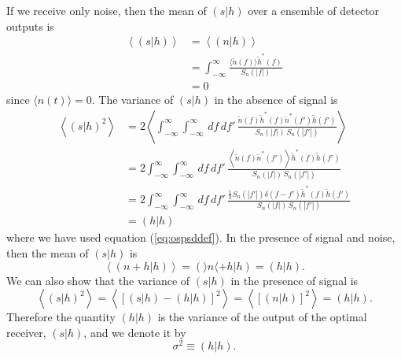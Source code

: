 If we receive only noise, then the mean of $(s|h)$ over a ensemble of detector
outputs is 
\begin{equation}
\begin{split}
\left\langle (s|h) \right\rangle &= \left\langle (n|h) \right\rangle \\
&= \int_{-\infty}^{\infty} 
   \frac{\langle\tilde{n}(f)\rangle \tilde{h}^\ast(f)}{S_n(|f|)} \\
&= 0
\end{split}
\end{equation}
since $\langle n(t) \rangle = 0$. The variance of $(s|h)$ in the absence of
signal is
\begin{equation}
\begin{split}
\left\langle(s|h)^2\right\rangle 
&= 2 \left\langle \int_{-\infty}^\infty \int_{-\infty}^\infty \,df\,df'\,
\frac{\tilde{n}(f)\tilde{h}^\ast(f) \tilde{n}^\ast(f')\tilde{h}(f')}
{S_n(|f|)\,S_n(|f'|)} \right\rangle \\
&= 2 \int_{-\infty}^\infty \int_{-\infty}^\infty \,df\,df'\,
\frac{\left\langle \tilde{n}(f)\tilde{n}^\ast(f')\right\rangle\tilde{h}^\ast(f)\tilde{h}(f')}
{S_n(|f|)\,S_n(|f'|)} \\
&= 2 \int_{-\infty}^\infty \int_{-\infty}^\infty \,df\,df'\,
\frac{\frac{1}{2}S_n(|f'|)\delta(f-f') \tilde{h}^\ast(f)\tilde{h}(f')}
{S_n(|f|)\,S_n(|f'|)} \\
&= (h|h)
\end{split}
\label{eq:filtervariance}
\end{equation}
where we have used equation (\ref{eq:ospsddef}).  In the presence of signal
and noise, then the mean of $(s|h)$ is
\begin{equation}
\left\langle (n+h|h) \right\rangle = (\rangle n \langle + h|h) = (h|h).
\end{equation}
We can also show that the variance of $(s|h)$ in the presence of signal is
\begin{equation}
\left\langle (s|h)^2 \right\rangle 
= \left\langle \left[ (s|h) - (h|h) \right]^2 \right\rangle
= \left\langle \left[ (n|h) \right]^2 \right\rangle
= (h|h).
\end{equation}
Therefore the quantity $(h|h)$ is the variance of the output of the optimal
receiver, $(s|h)$, and we denote it by
\begin{equation}
\sigma^2 \equiv (h|h).
\label{eq:sigmasqdef}
\end{equation}

